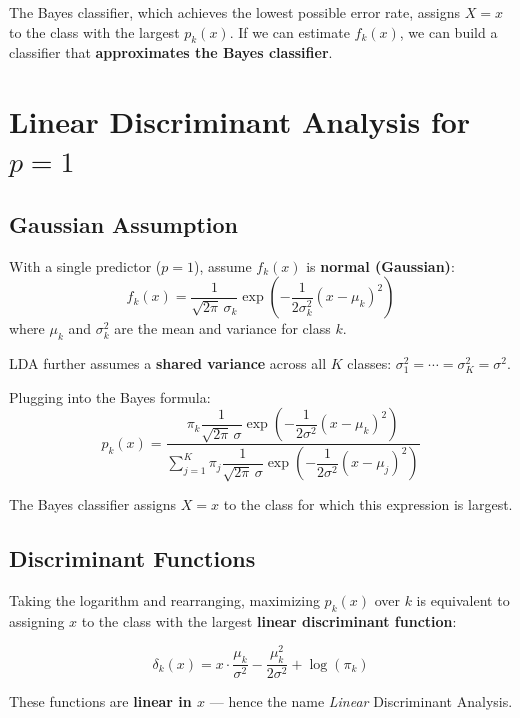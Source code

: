 \documentclass[11pt,a4paper]{article}
\theoremstyle{definition}
\theoremstyle{plain}
\theoremstyle{remark}
\begin{document}
The Bayes classifier, which achieves the lowest possible error rate, assigns $X = x$ to the class with the largest $p_k(x)$. If we can estimate $f_k(x)$, we can build a classifier that \textbf{approximates the Bayes classifier}.

\section{Linear Discriminant Analysis for \texorpdfstring{$p = 1$}{p=1}}

\subsection{Gaussian Assumption}

With a single predictor ($p = 1$), assume $f_k(x)$ is \textbf{normal (Gaussian)}:
\[
    f_k(x) = \frac{1}{\sqrt{2\pi}\,\sigma_k} \exp\!\left(-\frac{1}{2\sigma_k^2}(x - \mu_k)^2\right)
\]
where $\mu_k$ and $\sigma_k^2$ are the mean and variance for class $k$.

LDA further assumes a \textbf{shared variance} across all $K$ classes: $\sigma_1^2 = \cdots = \sigma_K^2 = \sigma^2$.

Plugging into the Bayes formula:
\[
    p_k(x) = \frac{\pi_k \dfrac{1}{\sqrt{2\pi}\,\sigma} \exp\!\left(-\dfrac{1}{2\sigma^2}(x - \mu_k)^2\right)}{\displaystyle\sum_{j=1}^{K} \pi_j \dfrac{1}{\sqrt{2\pi}\,\sigma} \exp\!\left(-\dfrac{1}{2\sigma^2}(x - \mu_j)^2\right)}
\]

The Bayes classifier assigns $X = x$ to the class for which this expression is largest.

\subsection{Discriminant Functions}

Taking the logarithm and rearranging, maximizing $p_k(x)$ over $k$ is equivalent to assigning $x$ to the class with the largest \textbf{linear discriminant function}:

\begin{tcolorbox}[colback=blue!5!white,colframe=blue!75!black,title=\textbf{Linear Discriminant Function ($p = 1$)}]
\[
    \delta_k(x) = x \cdot \frac{\mu_k}{\sigma^2} - \frac{\mu_k^2}{2\sigma^2} + \log(\pi_k)
\]
\end{tcolorbox}

These functions are \textbf{linear in $x$} — hence the name \textit{Linear} Discriminant Analysis.
\end{document}
